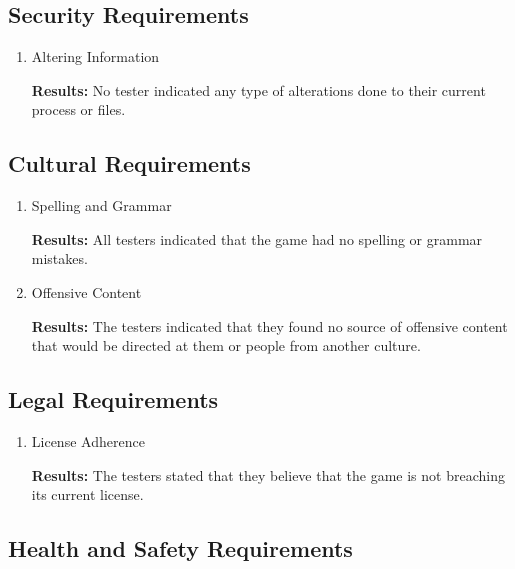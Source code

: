 \documentclass[12pt, titlepage]{article}
\begin{document}
\subsection{Security Requirements}

\begin{enumerate}

\item{Altering Information\\}

\textbf{Results: }No tester indicated any type of alterations done to their current process or files.

\end{enumerate}


\subsection{Cultural Requirements}

\begin{enumerate}

\item{Spelling and Grammar\\}

\textbf{Results:} All testers indicated that the game had no spelling or grammar mistakes.

\item{Offensive Content\\}

\textbf{Results: }The testers indicated that they found no source of offensive content that would be directed at them or people from another culture.

\end{enumerate}

\subsection{Legal Requirements}

\begin{enumerate}

\item{License Adherence\\}

\textbf{Results: }The testers stated that they believe that the game is not breaching its current license.

\end{enumerate}

\subsection{Health and Safety Requirements}
\end{document}
